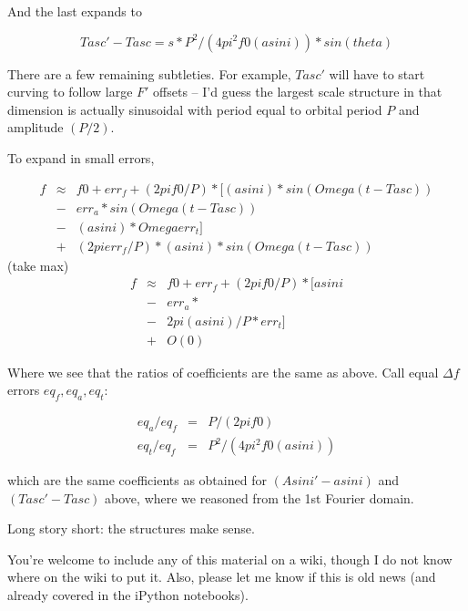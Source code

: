 \documentclass{article}
\begin{document}
And the last expands to

\begin{equation}
Tasc' - Tasc     = s * P^2/(4 pi^2 f0 (a sin i)) * sin(theta)
\end{equation}

There are a few remaining subtleties. For example, $Tasc'$ will have to
start curving to follow large $F'$ offsets -- I'd guess the largest scale
structure in that dimension is actually sinusoidal with period equal to
orbital period $P$ and amplitude $(P/2)$.

To expand in small errors,

\begin{eqnarray}
f &\approx& f0 + err_f + (2pi f0/P)*[
                     (a sin i)*sin(Omega(t-Tasc)) \\
                   &-& err_a * sin(Omega(t-Tasc)) \\
                   &-& (a sin i) * Omega err_t] \\
                   &+& (2pi err_f/P)*(a sin i)*sin(Omega(t-Tasc))
\end{eqnarray}
  (take max)
\begin{eqnarray}
f &\approx& f0 + err_f + (2pi f0/P)*[
                     a sin i \\ 
                   &-& err_a * \\
                   &-& 2 pi (a sin i)/P * err_t] \\
                   &+& O(0)
\end{eqnarray}

Where we see that the ratios of coefficients are the same as above. Call
equal $\Delta f$ errors $eq_f, eq_a, eq_t$:

\begin{eqnarray}
eq_a / eq_f &=& P / (2 pi f0)\\
eq_t / eq_f &=& P^2/(4 pi^2 f0 (a sin i))
\end{eqnarray}

which are the same coefficients as obtained for $(Asini' - a sin i)$ and
$(Tasc' - Tasc)$ above, where we reasoned from the 1st Fourier domain.

Long story short: the structures make sense.

You're welcome to include any of this material on a wiki, though I do
not know where on the wiki to put it. Also, please let me know if this
is old news (and already covered in the iPython notebooks).

\end{document}
